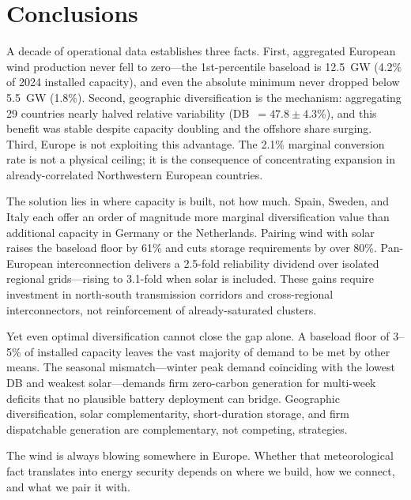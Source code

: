 \documentclass{article}
\begin{document}
\section{Conclusions}

A decade of operational data establishes three facts. First, aggregated European wind production never fell to zero---the 1st-percentile baseload is \SI{12.5}{\giga\watt} (4.2\% of 2024 installed capacity), and even the absolute minimum never dropped below \SI{5.5}{\giga\watt} (1.8\%). Second, geographic diversification is the mechanism: aggregating 29 countries nearly halved relative variability (DB~$= 47.8 \pm 4.3$\%), and this benefit was stable despite capacity doubling and the offshore share surging. Third, Europe is not exploiting this advantage. The 2.1\% marginal conversion rate is not a physical ceiling; it is the consequence of concentrating expansion in already-correlated Northwestern European countries.

The solution lies in where capacity is built, not how much. Spain, Sweden, and Italy each offer an order of magnitude more marginal diversification value than additional capacity in Germany or the Netherlands. Pairing wind with solar raises the baseload floor by 61\% and cuts storage requirements by over 80\%. Pan-European interconnection delivers a 2.5-fold reliability dividend over isolated regional grids---rising to 3.1-fold when solar is included. These gains require investment in north-south transmission corridors and cross-regional interconnectors, not reinforcement of already-saturated clusters.

Yet even optimal diversification cannot close the gap alone. A baseload floor of 3--5\% of installed capacity leaves the vast majority of demand to be met by other means. The seasonal mismatch---winter peak demand coinciding with the lowest DB and weakest solar---demands firm zero-carbon generation for multi-week deficits that no plausible battery deployment can bridge. Geographic diversification, solar complementarity, short-duration storage, and firm dispatchable generation are complementary, not competing, strategies.

The wind is always blowing somewhere in Europe. Whether that meteorological fact translates into energy security depends on where we build, how we connect, and what we pair it with.


\end{document}
